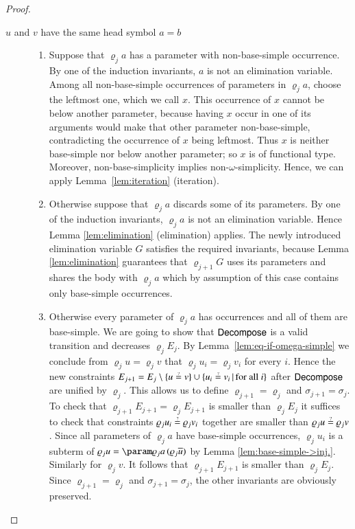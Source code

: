 \begin{proof}
    \begin{description}
    \item[$u$ and $v$ have the same head symbol $a=b$] \hfill
    \begin{enumerate}[beginpenalty=1000]
    \item Suppose that $\varrho_{j}a$ has a parameter with non-base-simple
    occurrence. By one of the induction invariants, $a$ is not an elimination
    variable. 
    Among all non-base-simple occurrences of parameters in $\varrho_{j}a$, 
    choose the leftmost one, which we call $x$.
    This occurrence of $x$ cannot be below another parameter, 
    because having $x$ occur in one of its arguments would make
    that other parameter non-base-simple, contradicting the occurrence of $x$ being leftmost.
    Thus $x$ is neither base-simple nor below another parameter; so $x$ is of functional type.
    Moreover, non-base-simplicity implies non-$\omega$-simplicity.
    Hence, we can apply Lemma~\ref{lem:iteration} (iteration).

    \item Otherwise suppose that $\varrho_{j}a$ discards some of its parameters.
    By one of the induction invariants, $\varrho_{j}a$ is not an elimination variable.
    Hence Lemma \ref{lem:elimination} (elimination) applies. The newly introduced elimination
    variable $G$ satisfies the required invariants, because Lemma \ref{lem:elimination}
    guarantees that $\varrho_{j+1}G$ uses its parameters and shares the
    body with $\varrho_{j}a$ which by assumption of this case contains
    only base-simple occurrences.

    \item Otherwise every parameter of $\varrho_{j}a$ has occurrences and
    all of them are base-simple. We are going to show that $\textsf{Decompose}$
    is a valid transition and decreases $\varrho_{j}E_{j}$. By Lemma~\ref{lem:eq-if-omega-simple}
    we conclude from $\varrho_{j}u=\varrho_{j}v$ that $\varrho_{j}u_{i}=\varrho_{j}v_{i}$
    for every $i$. Hence the new constraints 
    $E_{j+1}=E_{j}\setminus\left\{ u\unif v\right\} \cup\set{u_{i}\unif v_{i}}{\text{for all }i}$
    after $\textsf{Decompose}$ are unified by $\varrho_{j}$.
    This allows us to define $\varrho_{j+1}=\varrho_{j}$ and
    $\sigma_{j+1}=\sigma_{j}$.
    To check that $\varrho_{j+1}E_{j+1}=\varrho_{j}E_{j+1}$ is smaller
    than $\varrho_{j}E_{j}$ it suffices to check that constraints $\varrho_{j}u_{i}\unif\varrho_{j}v_{i}$
    together are smaller than $\varrho_{j}u\unif\varrho_{j}v$. Since
    all parameters of $\varrho_{j}a$ have base-simple occurrences, $\varrho_{j}u_{i}$
    is a subterm of $\varrho_{j}u=\param\varrho_{j}a\,(\varrho_{j}\seq u)$
    by Lemma \ref{lem:base-simple->inj.}. Similarly for $\varrho_{j}v$.
    It follows that $\varrho_{j+1}E_{j+1}$ is smaller
    than $\varrho_{j}E_{j}$.
    Since $\varrho_{j+1}=\varrho_{j}$ and
    $\sigma_{j+1}=\sigma_{j}$, the other
    invariants are obviously preserved.


\end{enumerate}
\end{description}
\end{proof}
